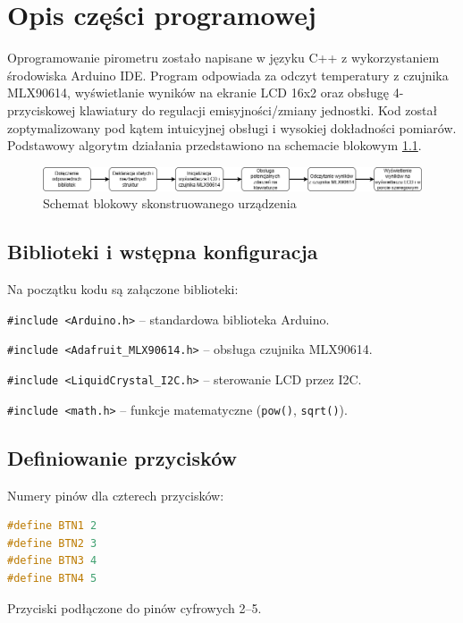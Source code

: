 \chapter{Opis części programowej}

Oprogramowanie pirometru zostało napisane w języku C++ z wykorzystaniem środowiska Arduino IDE. Program odpowiada za odczyt temperatury z czujnika MLX90614, wyświetlanie wyników na ekranie LCD 16x2 oraz obsługę 4-przyciskowej klawiatury do regulacji emisyjności/zmiany jednostki. Kod został zoptymalizowany pod kątem intuicyjnej obsługi i wysokiej dokładności pomiarów. Podstawowy algorytm działania przedstawiono na schemacie blokowym \ref{fig:blok}.

\vspace{24pt}

\begin{figure}[h!]
    \centering
    \includegraphics[width=1.1\textwidth]{images/program.png}
    \caption{Schemat blokowy skonstruowanego urządzenia} 
    \label{fig:blok}
\end{figure}


\section{Biblioteki i wstępna konfiguracja}

Na początku kodu są załączone biblioteki:

\texttt{\#include <Arduino.h>} – standardowa biblioteka Arduino.

\texttt{\#include <Adafruit\_MLX90614.h>} – obsługa czujnika MLX90614.

\texttt{\#include <LiquidCrystal\_I2C.h>} – sterowanie LCD przez I2C.

\texttt{\#include <math.h>} – funkcje matematyczne (\texttt{pow()}, \texttt{sqrt()}).

\section*{Definiowanie przycisków}
Numery pinów dla czterech przycisków:
\begin{lstlisting}[language=C++]
#define BTN1 2
#define BTN2 3
#define BTN3 4
#define BTN4 5
\end{lstlisting}
Przyciski podłączone do pinów cyfrowych 2–5.

